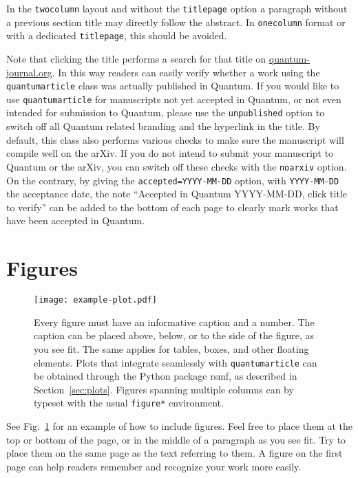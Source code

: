 \documentclass[a4paper,twocolumn,11pt,accepted=2017-05-09]{quantumarticle}
\begin{document}
In the \texttt{twocolumn} layout and without the \texttt{titlepage} option a paragraph without a previous section title may directly follow the abstract.
In \texttt{onecolumn} format or with a dedicated \texttt{titlepage}, this should be avoided.

Note that clicking the title performs a search for that title on \href{http://quantum-journal.org}{quantum-journal.org}.
In this way readers can easily verify whether a work using the \texttt{quantumarticle} class was actually published in Quantum.
If you would like to use \texttt{quantumarticle} for manuscripts not yet accepted in Quantum, or not even intended for submission to Quantum, please use the \texttt{unpublished} option to switch off all Quantum related branding and the hyperlink in the title.
By default, this class also performs various checks to make sure the manuscript will compile well on the arXiv.
If you do not intend to submit your manuscript to Quantum or the arXiv, you can switch off these checks with the \texttt{noarxiv} option.
On the contrary, by giving the \texttt{accepted=YYYY-MM-DD} option, with \texttt{YYYY-MM-DD} the acceptance date, the note ``Accepted in Quantum YYYY-MM-DD, click title to verify'' can be added to the bottom of each page to clearly mark works that have been accepted in Quantum.

\section{Figures}
\begin{figure}[t]
  \centering
  \texttt{[image: example-plot.pdf]}
  \caption{Every figure must have an informative caption and a number.
    The caption can be placed above, below, or to the side of the figure, as you see fit.
    The same applies for tables, boxes, and other floating elements.
    Plots that integrate seamlessly with \texttt{quantumarticle} can be obtained through the Python package rsmf, as described in Section~\ref{sec:plots}.
    Figures spanning multiple columns can by typeset with the usual \texttt{figure*} environment.}
  \label{fig:figure1}
\end{figure}
See Fig.~\ref{fig:figure1} for an example of how to include figures.
Feel free to place them at the top or bottom of the page, or in the middle of a paragraph as you see fit.
Try to place them on the same page as the text referring to them.
A figure on the first page can help readers remember and recognize your work more easily.
\end{document}
